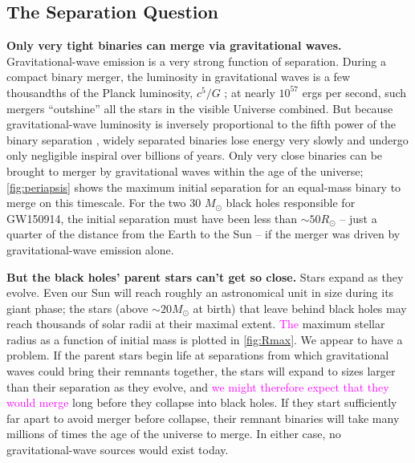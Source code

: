 \documentclass[iop,onecolumn]{revtex4}
\newcommand{\ilya}[1]{\textcolor{magenta}{#1}}
\begin{document}
\subsection{The Separation Question}



\textbf{Only very tight binaries can merge via gravitational waves.} Gravitational-wave emission is a very strong function of separation. During a compact binary merger, the luminosity in gravitational waves is a few thousandths of the Planck luminosity, $c^5/G$ \citep[e.g.,][]{Cardoso:2018}; at nearly $10^{57}$ ergs per second, such mergers ``outshine'' all the stars in the visible Universe combined. But because gravitational-wave luminosity is inversely proportional to the fifth power of the binary separation \citep{Peters:1964}, widely separated binaries lose energy very slowly and undergo only negligible inspiral over billions of years. Only very close binaries can be brought to merger by gravitational waves within the age of the universe; \autoref{fig:periapsis} shows the maximum initial separation for an equal-mass binary to merge on this timescale. For the two 30 $M_\odot$ black holes responsible for GW150914, the initial separation must have been less than $\sim 50 R_\odot$ -- just a quarter of the distance from the Earth to the Sun -- if the merger was driven by gravitational-wave emission alone.


\textbf{But the black holes' parent stars can't get so close.} Stars expand as they evolve. Even our Sun will reach roughly an astronomical unit in size during its giant phase; the stars (above $\sim 20 M_\odot$  at birth) that leave behind black holes may reach thousands of solar radii at their maximal extent. \ilya{The} maximum stellar radius as a function of initial mass is plotted in \autoref{fig:Rmax}. We appear to have a problem. If the parent stars begin life at separations from which gravitational waves could bring their remnants together, the stars will expand to sizes larger than their separation as they evolve, and \ilya{we might therefore expect that they would merge} long before they collapse into black holes. If they start sufficiently far apart to avoid merger before collapse, their remnant binaries will take many millions of times the age of the universe to merge. In either case, no gravitational-wave sources would exist today. 
\end{document}
